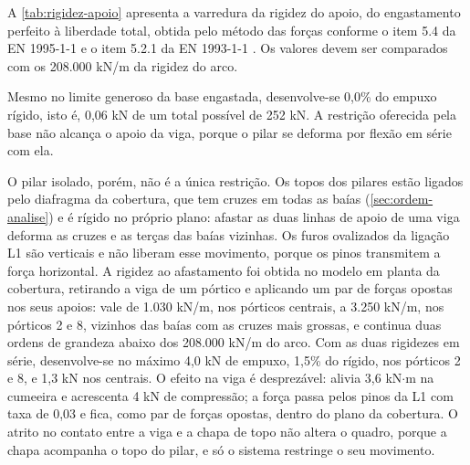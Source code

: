 A \autoref{tab:rigidez-apoio} apresenta a varredura da rigidez do apoio, do
engastamento perfeito à liberdade total, obtida pelo método das forças conforme
o item 5.4 da EN 1995-1-1 \cite{EN1995-1-1:2004} e o item 5.2.1 da
EN 1993-1-1 \cite{EN1993-1-1:2005}. Os valores devem ser comparados com os
208.000 kN/m da rigidez do arco.


Mesmo no limite generoso da base engastada,
desenvolve-se 0,0\% do empuxo rígido, isto é, 0,06 kN de um total possível de
252 kN. A restrição oferecida pela base não alcança o apoio da viga, porque
o pilar se deforma por flexão em série com ela.

O pilar isolado, porém, não é a única restrição. Os topos dos pilares estão
ligados pelo diafragma da cobertura, que tem cruzes em todas as baías
(\autoref{sec:ordem-analise}) e é rígido no próprio plano: afastar as duas linhas
de apoio de uma viga deforma as cruzes e as terças das baías vizinhas. Os furos
ovalizados da ligação L1 são verticais e não liberam esse movimento, porque os pinos
transmitem a força horizontal. A rigidez ao afastamento foi obtida no modelo em
planta da cobertura, retirando a viga de um pórtico e aplicando um par de forças
opostas nos seus apoios: vale de 1.030 kN/m, nos pórticos centrais, a 3.250 kN/m,
nos pórticos 2 e 8, vizinhos das baías com as cruzes mais grossas, e continua
duas ordens de grandeza abaixo dos 208.000 kN/m do arco. Com as duas rigidezes em
série, desenvolve-se no máximo 4,0 kN de empuxo, 1,5\% do rígido, nos pórticos 2 e
8, e 1,3 kN nos centrais. O efeito na viga é desprezável: alivia 3,6 kN$\cdot$m na
cumeeira e acrescenta 4 kN de compressão; a força passa pelos pinos da L1 com taxa
de 0,03 e fica, como par de forças opostas, dentro do plano da cobertura. O atrito
no contato entre a viga e a chapa de topo não altera o quadro, porque a chapa
acompanha o topo do pilar, e só o sistema restringe o seu movimento.

